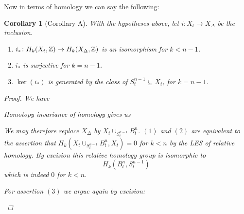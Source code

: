 \documentclass[A4paper, british, reqno]{amsart}
\theoremstyle{darkgreentheorem}
\newtheorem{cor}[thm]{Corollary}
\theoremstyle{darkbluedefinition}
\theoremstyle{darkredexample}
\theoremstyle{remark}
\newcommand{\1}{\mathbbm{1}}
\newcommand{\sub}{\subseteq}
\begin{document}
Now in terms of homology we can say the following:

\begin{cor}[Corollary A]
    With the hypotheses above, let $i\colon X_{t}\to X_{\Delta}$ be the inclusion.
    \begin{enumerate}
	\item $i_{*}\colon H_{k}(X_{t},\mathbb{Z})\to H_{k}(X_{\Delta},\mathbb{Z})$ is an isomorphism for $k<n-1$.
	\item $i_{*}$ is surjective for $k=n-1$.
	\item $\ker(i_{*})$ is generated by the class of $S_{t}^{n-1}\sub X_{t}$, for $k=n-1$.
    \end{enumerate}
    \begin{proof}
	We have
	\begin{center}
	\end{center}
	Homotopy invariance of homology gives us
	\begin{center}
	\end{center}
	We may therefore replace $X_{\Delta}$ by $X_{t}\cup_{S_{t}^{n-1}}B^{n}_{t}$.
	$(1)$ and $(2)$ are equivalent to the assertion that $H_{k}(X_{t}\cup_{S_{t}^{n-1}}B^{n}_{t},X_{t})=0$ for $k<n$ by the LES of relative homology.
	By excision this relative homology group is isomorphic to
	\[ H_{k}(B_{t}^{n},S_{t}^{n-1}) \]
	which is indeed $0$ for $k<n$.

	For assertion $(3)$ we argue again by excision:
	\begin{center}
	\end{center}
    \end{proof}
\end{cor}
\end{document}
